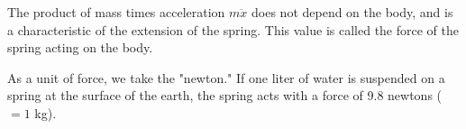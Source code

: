 The product of mass times acceleration $m\ddot{x}$ does not depend on the body, and is a characteristic of the extension of the spring. This value is called the force of the spring acting on the body.

As a unit of force, we take the "newton." If one liter of water is suspended on a spring at the surface of the earth, the spring acts with a force of 9.8 newtons ($= 1$ kg).
